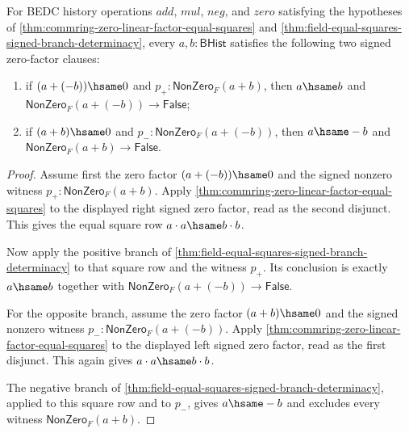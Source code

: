 \begin{theorem}
\label{thm:field-zero-linear-factor-signed-branch-selection}
For BEDC history operations $add$, $mul$, $neg$, and $zero$ satisfying the
hypotheses of
\autoref{thm:commring-zero-linear-factor-equal-squares} and
\autoref{thm:field-equal-squares-signed-branch-determinacy}, every
$a,b:\mathsf{BHist}$ satisfies the following two signed zero-factor clauses:
\begin{enumerate}
  \item if $(a+(-b))\hsame0$ and $p_+:\mathsf{NonZero}_F(a+b)$, then
  $a\hsame b$ and $\mathsf{NonZero}_F(a+(-b))\to\mathsf{False}$;
  \item if $(a+b)\hsame0$ and $p_-:\mathsf{NonZero}_F(a+(-b))$, then
  $a\hsame -b$ and $\mathsf{NonZero}_F(a+b)\to\mathsf{False}$.
\end{enumerate}
\end{theorem}
\begin{proof}
Assume first the zero factor $(a+(-b))\hsame0$ and the signed nonzero witness
$p_+:\mathsf{NonZero}_F(a+b)$. Apply
\autoref{thm:commring-zero-linear-factor-equal-squares} to the displayed
right signed zero factor, read as the second disjunct. This gives the equal
square row $a\cdot a\hsame b\cdot b$.

Now apply the positive branch of
\autoref{thm:field-equal-squares-signed-branch-determinacy} to that square
row and the witness $p_+$. Its conclusion is exactly $a\hsame b$ together with
$\mathsf{NonZero}_F(a+(-b))\to\mathsf{False}$.

For the opposite branch, assume the zero factor $(a+b)\hsame0$ and the signed
nonzero witness $p_-:\mathsf{NonZero}_F(a+(-b))$. Apply
\autoref{thm:commring-zero-linear-factor-equal-squares} to the displayed left
signed zero factor, read as the first disjunct. This again gives
$a\cdot a\hsame b\cdot b$.

The negative branch of
\autoref{thm:field-equal-squares-signed-branch-determinacy}, applied to this
square row and to $p_-$, gives $a\hsame -b$ and excludes every witness
$\mathsf{NonZero}_F(a+b)$.
\end{proof}

